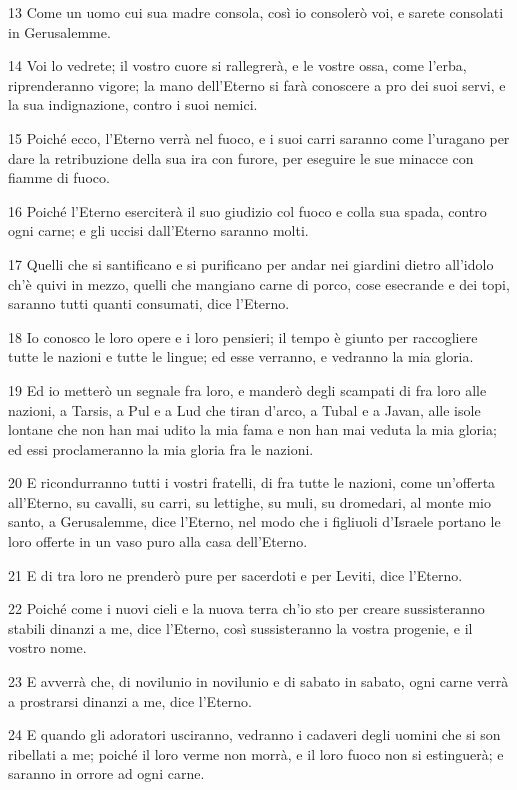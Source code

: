 \par 13 Come un uomo cui sua madre consola, così io consolerò voi, e sarete consolati in Gerusalemme.
\par 14 Voi lo vedrete; il vostro cuore si rallegrerà, e le vostre ossa, come l'erba, riprenderanno vigore; la mano dell'Eterno si farà conoscere a pro dei suoi servi, e la sua indignazione, contro i suoi nemici.
\par 15 Poiché ecco, l'Eterno verrà nel fuoco, e i suoi carri saranno come l'uragano per dare la retribuzione della sua ira con furore, per eseguire le sue minacce con fiamme di fuoco.
\par 16 Poiché l'Eterno eserciterà il suo giudizio col fuoco e colla sua spada, contro ogni carne; e gli uccisi dall'Eterno saranno molti.
\par 17 Quelli che si santificano e si purificano per andar nei giardini dietro all'idolo ch'è quivi in mezzo, quelli che mangiano carne di porco, cose esecrande e dei topi, saranno tutti quanti consumati, dice l'Eterno.
\par 18 Io conosco le loro opere e i loro pensieri; il tempo è giunto per raccogliere tutte le nazioni e tutte le lingue; ed esse verranno, e vedranno la mia gloria.
\par 19 Ed io metterò un segnale fra loro, e manderò degli scampati di fra loro alle nazioni, a Tarsis, a Pul e a Lud che tiran d'arco, a Tubal e a Javan, alle isole lontane che non han mai udito la mia fama e non han mai veduta la mia gloria; ed essi proclameranno la mia gloria fra le nazioni.
\par 20 E ricondurranno tutti i vostri fratelli, di fra tutte le nazioni, come un'offerta all'Eterno, su cavalli, su carri, su lettighe, su muli, su dromedari, al monte mio santo, a Gerusalemme, dice l'Eterno, nel modo che i figliuoli d'Israele portano le loro offerte in un vaso puro alla casa dell'Eterno.
\par 21 E di tra loro ne prenderò pure per sacerdoti e per Leviti, dice l'Eterno.
\par 22 Poiché come i nuovi cieli e la nuova terra ch'io sto per creare sussisteranno stabili dinanzi a me, dice l'Eterno, così sussisteranno la vostra progenie, e il vostro nome.
\par 23 E avverrà che, di novilunio in novilunio e di sabato in sabato, ogni carne verrà a prostrarsi dinanzi a me, dice l'Eterno.
\par 24 E quando gli adoratori usciranno, vedranno i cadaveri degli uomini che si son ribellati a me; poiché il loro verme non morrà, e il loro fuoco non si estinguerà; e saranno in orrore ad ogni carne.


